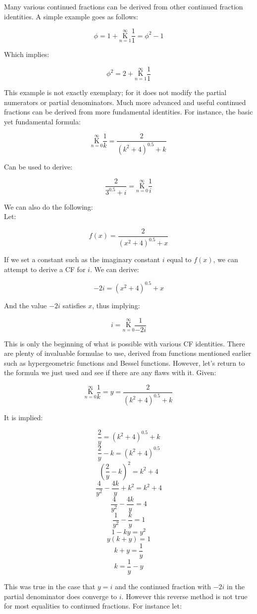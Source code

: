 \documentclass{article}
\begin{document}
Many various continued fractions can be derived from other continued fraction identities. A simple example goes as follows:

$$\phi=1+\underset{n=1}{\overset{\infty}{\mathrm K}} \frac{1}{1} = \phi^2 - 1$$

Which implies:

$$\phi^2=2+\underset{n=1}{\overset{\infty}{\mathrm K}}\frac{1}{1}$$

This example is not exactly exemplary; for it does not modify the partial numerators or partial denominators. Much more advanced and useful continued fractions can be derived from more fundamental identities. For instance, the basic yet fundamental formula:

$$\underset{n=0}{\overset{\infty}{\mathrm K}} \frac{1}{k} = \frac{2}{(k^2+4)^{0.5}+k}$$

Can be used to derive:

$$\frac{2}{3^{0.5}+i}=\underset{n=0}{\overset{\infty}{\mathrm K}} \frac{1}{i}$$

We can also do the following:
$${}$$
Let:

$$f(x)=\frac{2}{(x^2+4)^{0.5}+x}$$

If we set a constant such as the imaginary constant $i$ equal to $f(x)$, we can attempt to derive a CF for $i$. We can derive:

$$-2i=(x^2+4)^{0.5}+x$$

And the value $-2i$ satisfies $x$, thus implying:

$$i=\underset{n=0}{\overset{\infty}{\mathrm K}} \frac{1}{-2i}$$

This is only the beginning of what is possible with various CF identities. There are plenty of invaluable formulae to use, derived from functions mentioned earlier such as hypergeometric functions and Bessel functions. However, let’s return to the formula we just used and see if there are any flaws with it. Given:

$$\underset{n=0}{\overset{\infty}{\mathrm K}} \frac{1}{k} = y = \frac{2}{(k^2+4)^{0.5}+k}$$

It is implied:

$$\frac{2}{y}=(k^2+4)^{0.5}+k$$
$$\frac{2}{y}-k=(k^2+4)^{0.5}$$
$$(\frac{2}{y}-k)^2=k^2+4$$
$$\frac{4}{y^2}-\frac{4k}{y}+k^2=k^2+4$$
$$\frac{4}{y^2}-\frac{4k}{y}=4$$
$$\frac{1}{y^2}-\frac{k}{y}=1$$
$$1-ky=y^2$$
$$y(k+y)=1$$
$$k+y=\frac{1}{y}$$
$$k=\frac{1}{y}-y$$

This was true in the case that $y=i$ and the continued fraction with $-2i$ in the partial denominator does converge to $i$. However this reverse method is not true for most equalities to continued fractions. For instance let:
\end{document}
